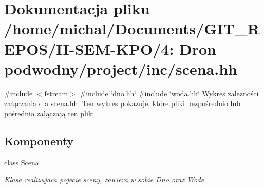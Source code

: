 \hypertarget{scena_8hh}{}\section{Dokumentacja pliku /home/michal/\+Documents/\+G\+I\+T\+\_\+\+R\+E\+P\+O\+S/\+I\+I-\/\+S\+E\+M-\/\+K\+P\+O/4\+: Dron podwodny/project/inc/scena.hh}
\label{scena_8hh}
{\ttfamily \#include $<$fstream$>$}\newline
{\ttfamily \#include \char`\"{}dno.\+hh\char`\"{}}\newline
{\ttfamily \#include \char`\"{}woda.\+hh\char`\"{}}\newline
Wykres zależności załączania dla scena.\+hh\+:
Ten wykres pokazuje, które pliki bezpośrednio lub pośrednio załączają ten plik\+:
\subsection*{Komponenty}
\begin{DoxyCompactItemize}
\item 
class \hyperlink{class_scena}{Scena}
\begin{DoxyCompactList}\small\item\em Klasa realizujaca pojecie sceny, zawiera w sobie \hyperlink{class_dno}{Dno} oraz Wode. \end{DoxyCompactList}\end{DoxyCompactItemize}
